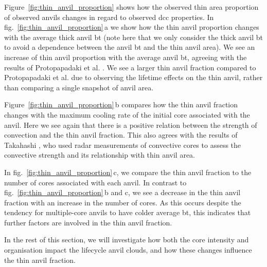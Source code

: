 Figure~\ref{fig:thin_anvil_proportion} shows how the observed thin area proportion of observed anvils changes in regard to observed \acrshort{dcc} properties.
In fig.~\ref{fig:thin_anvil_proportion}\,a we show how the thin anvil proportion changes with the average thick anvil \acrshort{bt} (note here that we only consider the thick anvil \acrshort{bt} to avoid a dependence between the anvil \acrshort{bt} and the thin anvil area).
We see an increase of thin anvil proportion with the average anvil \acrshort{bt}, agreeing with the results of Protopapadaki et al. \cite{missing_Protopapadaki}.
We see a larger thin anvil fraction compared to Protopapadaki et al. due to observing the lifetime effects on the thin anvil, rather than comparing a single snapshot of anvil area.

Figure~\ref{fig:thin_anvil_proportion}\,b compares how the thin anvil fraction changes with the maximum cooling rate of the initial core associated with the anvil.
Here we see again that there is a positive relation between the strength of convection and the thin anvil fraction.
This also agrees with the results of Takahashi \cite{takahashi_comms}, who used radar measurements of convective cores to assess the convective strength and its relationship with thin anvil area.

In fig.~\ref{fig:thin_anvil_proportion}\,c, we compare the thin anvil fraction to the number of cores associated with each anvil.
In contrast to fig.~\ref{fig:thin_anvil_proportion}\,b and c, we see a decrease in the thin anvil fraction with an increase in the number of cores.
As this occurs despite the tendency for multiple-core anvils to have colder average \acrshort{bt}, this indicates that further factors are involved in the thin anvil fraction.

In the rest of this section, we will investigate how both the core intensity and organisation impact the lifecycle anvil clouds, and how these changes influence the thin anvil fraction.

